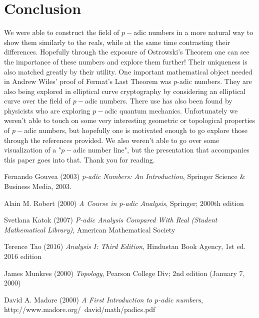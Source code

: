 \documentclass[12pt]{article}
\theoremstyle{definition}
\theoremstyle{remark}
\begin{document}
\section{Conclusion}
    We were able to construct the field of $p-$adic numbers in a more natural way to show them similarly to the reals, while at the same time contrasting their differences. Hopefully through the exposure of Ostrowski's Theorem one can see the importance of these numbers and explore them further! Their uniqueness is also matched greatly by their utility. One important mathematical object needed in Andrew Wiles' proof of Fermat's Last Theorem was $p$-adic numbers. They are also being explored in elliptical curve cryptography by considering an elliptical curve over the field of $p-$adic numbers. There use has also been found by physicists who are exploring $p-$adic quantum mechanics. Unfortunately we weren't able to touch on some very interesting geometric or topological properties of $p-$adic numbers, but hopefully one is motivated enough to go explore those through the references provided. We also weren't able to go over some visualization of a "$p-$adic number line", but the presentation that accompanies this paper goes into that. Thank you for reading.

\newpage
\begin{thebibliography}{9}
    Fernando Gouvea (2003) \emph{p-adic Numbers: An Introduction}, Springer Science \& Business Media, 2003.
    
    Alain M. Robert (2000) \emph{A Course in p-adic Analysis}, Springer; 2000th edition

    Svetlana Katok (2007) \emph{P-adic Analysis Compared With Real (Student Mathematical Library)}, American Mathematical Society
    
    Terence Tao (2016) \emph{Analysis I: Third Edition}, Hindustan Book Agency, 1st ed. 2016 edition

    James Munkres (2000) \emph{Topology}, Pearson College Div; 2nd edition (January 7, 2000)

    \bibitem{}
    David A. Madore (2000) \emph{A First Introduction to $p$-adic numbers}, http://www.madore.org/~david/math/padics.pdf
  \end{thebibliography}
\end{document}
